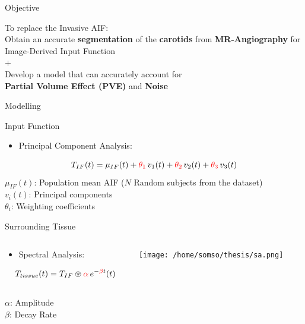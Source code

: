 \documentclass[aspectratio=169]{beamer}
\begin{document}
\begin{frame}{Objective}
	\centering\Large

	To replace the Invasive AIF:\\Obtain an accurate \textbf{segmentation} of the \textbf{carotids} from \textbf{MR-Angiography} for Image-Derived Input Function\\
	\bigskip
	+ \\
	\bigskip
	\Large{Develop a model that can accurately account for \\
		\textbf{Partial Volume Effect (PVE)} and \textbf{Noise}}
\end{frame}

\begin{frame}{Modelling}
	\small
	\begin{block}{Input Function}
		\begin{itemize}
			\item Principal Component Analysis:
		\end{itemize}

		\[
			T_{IF}(t) = \mu_{IF}(t) +  \textcolor{red}{\theta_1}\,v_1(t) +  \textcolor{red}{\theta_2}\,v_2(t) +  \textcolor{red}{\theta_3}\,v_3(t)
		\]
		\(\mu_{IF}(t)\): Population mean AIF ($N$ Random subjects from the dataset)\\
		\(v_{i}(t)\): Principal components \\
		\(\theta_{i}\): Weighting coefficients
	\end{block}
	\pause
	\begin{block}{Surrounding Tissue}
		\vspace{4pt}
		\begin{columns}[T]
			\begin{column}[T]{0.6\textwidth}
				\begin{itemize}
					\item
					      Spectral Analysis:
				\end{itemize}
				\vspace{1ex}
				\[
					T_{tissue}(t) = T_{IF} \circledast \textcolor{red}{\alpha}\,e^{-\textcolor{red}{\beta}t} (t)
				\]
				\\
				$\alpha$: Amplitude\\
				$\beta$: Decay Rate
			\end{column}

			\begin{column}{0.25\textwidth}
				\texttt{[image: /home/somso/thesis/sa.png]}
			\end{column}
		\end{columns}
	\end{block}
\end{frame}
\end{document}
